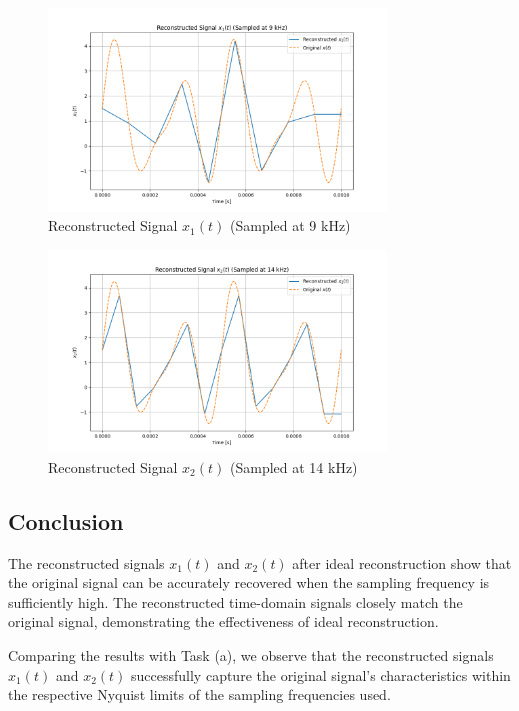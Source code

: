 \begin{figure}[h]
    \centering
    \includegraphics[width=0.8\textwidth]{fig/ex1_c_reconstructed_x1.png}
    \caption{Reconstructed Signal $x_1(t)$ (Sampled at 9 kHz)}
    \label{fig:ex1_c_reconstructed_x1}
\end{figure}

\begin{figure}[h]
    \centering
    \includegraphics[width=0.8\textwidth]{fig/ex1_c_reconstructed_x2.png}
    \caption{Reconstructed Signal $x_2(t)$ (Sampled at 14 kHz)}
    \label{fig:ex1_c_reconstructed_x2}
\end{figure}

\subsection*{Conclusion}
The reconstructed signals \( x_1(t) \) and \( x_2(t) \) after ideal reconstruction show that the original signal can be accurately recovered when the sampling frequency is sufficiently high. The reconstructed time-domain signals closely match the original signal, demonstrating the effectiveness of ideal reconstruction.

Comparing the results with Task (a), we observe that the reconstructed signals \( x_1(t) \) and \( x_2(t) \) successfully capture the original signal's characteristics within the respective Nyquist limits of the sampling frequencies used.

